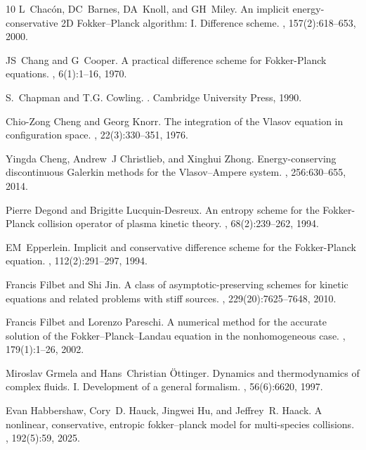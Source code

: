 \documentclass[preprint,1p,times]{elsarticle}
\theoremstyle{definition}
\theoremstyle{remark}
\begin{document}
\begin{thebibliography}{10}
L~Chac{\'o}n, DC~Barnes, DA~Knoll, and GH~Miley.
\newblock An implicit energy-conservative 2{D} {F}okker--{P}lanck algorithm:
  {I}. {D}ifference scheme.
, 157(2):618--653, 2000.

JS~Chang and G~Cooper.
\newblock A practical difference scheme for {F}okker-{P}lanck equations.
, 6(1):1--16, 1970.

S.~Chapman and T.G. Cowling.
.
\newblock Cambridge University Press, 1990.

Chio-Zong Cheng and Georg Knorr.
\newblock The integration of the {V}lasov equation in configuration space.
, 22(3):330--351, 1976.

Yingda Cheng, Andrew~J Christlieb, and Xinghui Zhong.
\newblock Energy-conserving discontinuous {G}alerkin methods for the
  {V}lasov--{A}mpere system.
, 256:630--655, 2014.

Pierre Degond and Brigitte Lucquin-Desreux.
\newblock An entropy scheme for the {F}okker-{P}lanck collision operator of
  plasma kinetic theory.
, 68(2):239--262, 1994.

EM~Epperlein.
\newblock Implicit and conservative difference scheme for the {F}okker-{P}lanck
  equation.
, 112(2):291--297, 1994.

Francis Filbet and Shi Jin.
\newblock A class of asymptotic-preserving schemes for kinetic equations and
  related problems with stiff sources.
, 229(20):7625--7648, 2010.

Francis Filbet and Lorenzo Pareschi.
\newblock A numerical method for the accurate solution of the
  {F}okker--{P}lanck--{L}andau equation in the nonhomogeneous case.
, 179(1):1--26, 2002.

Miroslav Grmela and Hans~Christian {\"O}ttinger.
\newblock Dynamics and thermodynamics of complex fluids. {I}. {D}evelopment of
  a general formalism.
, 56(6):6620, 1997.

Evan Habbershaw, Cory~D. Hauck, Jingwei Hu, and Jeffrey~R. Haack.
\newblock A nonlinear, conservative, entropic fokker--planck model for
  multi-species collisions.
, 192(5):59, 2025.


\end{thebibliography}
\end{document}
